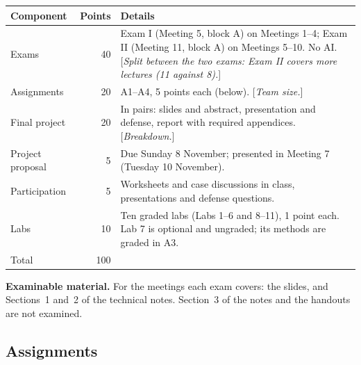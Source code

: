 \documentclass[11pt]{article}
\newcommand{\tbd}[1]{\textcolor{warnred}{[\emph{#1}]}}
\begin{document}
\begin{center}
\small
\begin{tabular}{lrL{8.6cm}}
\toprule
\textbf{Component} & \textbf{Points} & \textbf{Details} \\
\midrule
Exams & 40 & Exam I (Meeting 5, block A) on Meetings 1--4; Exam II (Meeting 11, block A) on Meetings 5--10. No AI. \tbd{Split between the two exams: Exam II covers more lectures (11 against 8).} \\
Assignments & 20 & A1--A4, 5 points each (below). \tbd{Team size.} \\
Final project & 20 & In pairs: slides and abstract, presentation and defense, report with required appendices. \tbd{Breakdown.} \\
Project proposal & 5 & Due Sunday 8 November; presented in Meeting 7 (Tuesday 10 November). \\
Participation & 5 & Worksheets and case discussions in class, presentations and defense questions. \\
Labs & 10 & Ten graded labs (Labs 1--6 and 8--11), 1 point each. Lab 7 is optional and ungraded; its methods are graded in A3. \\
\midrule
Total & 100 & \\
\bottomrule
\end{tabular}
\end{center}

\textbf{Examinable material.} For the meetings each exam covers: the slides, and Sections~1 and~2
of the technical notes. Section~3 of the notes and the handouts are not examined.

\subsection*{Assignments}
\end{document}
